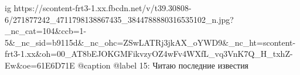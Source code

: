 
 
 
 
 

\ifcmt
  ig https://scontent-frt3-1.xx.fbcdn.net/v/t39.30808-6/271877242_4711798138867435_3844788880316535102_n.jpg?_nc_cat=104&ccb=1-5&_nc_sid=b9115d&_nc_ohc=ZSwLATRj3jkAX_oYWD9&_nc_ht=scontent-frt3-1.xx&oh=00_AT8bEJOKGMFikvzyOZ4wFv4WXfL_vq3VnK7Q_H_txhZ-Ew&oe=61E6D71E
  @caption @label 15: Читаю последние известия
\fi
